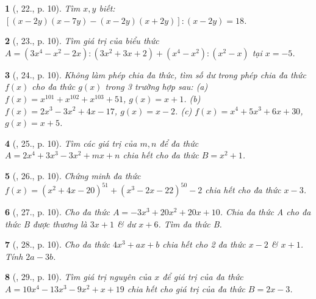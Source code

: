 \documentclass{article}
\newtheorem{baitoan}{}
\begin{document}
\begin{baitoan}[\cite{Tuyen_Toan_8}, 22., p. 10]
	Tìm $x,y$ biết: $[(x - 2y)(x - 7y) - (x - 2y)(x + 2y)]:(x - 2y) = 18$.
\end{baitoan}

\begin{baitoan}[\cite{Tuyen_Toan_8}, 23., p. 10]
	Tìm giá trị của biểu thức $A = (3x^4 - x^2 - 2x):(3x^2 + 3x + 2) + (x^4 - x^2):(x^2 - x)$ tại $x = -5$.
\end{baitoan}

\begin{baitoan}[\cite{Tuyen_Toan_8}, 24., p. 10]
	Không làm phép chia đa thức, tìm số dư trong phép chia đa thức $f(x)$ cho đa thức $g(x)$ trong 3 trường hợp sau: (a) $f(x) = x^{101} + x^{102} + x^{103} + 51$, $g(x) = x + 1$. (b) $f(x) = 2x^3 - 3x^2 + 4x - 17$, $g(x) = x - 2$. (c) $f(x) = x^4 + 5x^3 + 6x + 30$, $g(x) = x + 5$.
\end{baitoan}

\begin{baitoan}[\cite{Tuyen_Toan_8}, 25., p. 10]
	Tìm các giá trị của $m,n$ để đa thức $A = 2x^4 + 3x^3 - 3x^2 + mx + n$ chia hết cho đa thức $B = x^2 + 1$.
\end{baitoan}

\begin{baitoan}[\cite{Tuyen_Toan_8}, 26., p. 10]
	Chứng minh đa thức $f(x) = (x^2 + 4x - 20)^{51} + (x^3 - 2x - 22)^{50} - 2$ chia hết cho đa thức $x - 3$.
\end{baitoan}

\begin{baitoan}[\cite{Tuyen_Toan_8}, 27., p. 10]
	Cho đa thức $A = -3x^3 + 20x^2 + 20x + 10$. Chia đa thức A cho đa thức B được thương là $3x + 1$ \& dư $x + 6$. Tìm đa thức B.
\end{baitoan}

\begin{baitoan}[\cite{Tuyen_Toan_8}, 28., p. 10]
	Cho đa thức $4x^3 + ax + b$ chia hết cho 2 đa thức $x - 2$ \& $x + 1$. Tính $2a - 3b$.
\end{baitoan}

\begin{baitoan}[\cite{Tuyen_Toan_8}, 29., p. 10]
	Tìm giá trị nguyên của $x$ để giá trị của đa thức $A = 10x^4 - 13x^3 - 9x^2 + x + 19$ chia hết cho giá trị của đa thức $B = 2x - 3$.
\end{baitoan}

\end{document}
